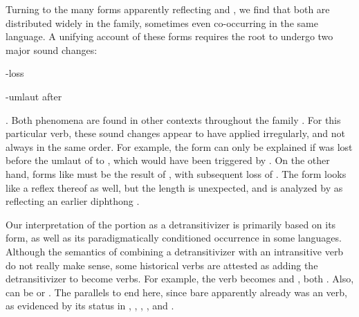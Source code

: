Turning to the many forms apparently reflecting  and , we find that both are distributed widely in the family, sometimes even co-occurring in the same language.
A unifying account of these forms requires the root  to undergo two major sound changes: \begin{inlinelist}
 \item {}-loss
 \item {}-umlaut after 
 \end{inlinelist}.
Both phenomena are found in other contexts throughout the family \parencite{meira2010origin}.
For this particular verb, these sound changes appear to have applied irregularly, and not always in the same order.
For example, the \kalina form  can only be explained if  was lost before the umlaut of  to , which would have been triggered by .
On the other hand, forms like \maqui {} must be the result of , with subsequent loss of .
The \akuriyo form  looks like a reflex thereof as well, but the length is unexpected, and is analyzed by \textcite[]{meira1998proto} as reflecting an earlier diphthong .


Our interpretation of the  portion as a detransitivizer is primarily based on its form, as well as its paradigmatically conditioned occurrence in some languages.
Although the semantics of combining a detransitivizer with an intransitive verb do not really make sense, some historical  verbs are attested as adding the detransitivizer to become  verbs.
For example, the \PC {} verb   becomes \trio {} \parencite[252]{triomeira1999} and \kalina {} \parencite[429]{courtz2008carib}, both .
Also, \waiwai {} can be  \parencite[30]{waiwaihawkins1998} or  \parencite[204]{hawkins1953waiwai}.
The parallels to  end here, since bare   apparently already was an  verb, as evidenced by its status in \kaxui, \kalina, \panare {}, \arara, and \trio.

